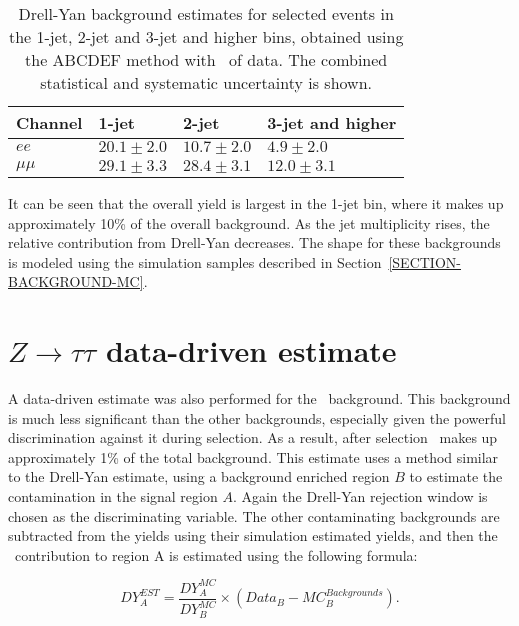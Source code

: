 \begin{table}[!h]
\begin{center}
   \begin{tabular}{l | lll}
    \hline
    Channel    & 1-jet       & 2-jet & 3-jet and higher \\
    \hline
    $ee$       & $20.1\pm 2.0$ & $10.7\pm 2.0$ & $4.9\pm 2.0$\\
    $\mu\mu $  & $29.1\pm 3.3$ & $28.4\pm 3.1$ & $12.0\pm 3.1$\\
    \hline
   \end{tabular}
 \caption{Drell-Yan background estimates for selected events in the 1-jet, 2-jet and 3-jet and higher bins, obtained using the ABCDEF method with \LUMI\ of data. The combined statistical and systematic uncertainty is shown.}
\label{TABLE-ABCD-RESULTS}
\end{center}
\end{table}

It can be seen that the overall yield is largest in the 1-jet bin, where it makes up approximately 10\% of the overall background. As the jet multiplicity rises, the relative contribution from Drell-Yan decreases. The shape for these backgrounds is modeled using the simulation samples described in Section~\ref{SECTION-BACKGROUND-MC}.

\section{$Z\to\tau\tau$ data-driven estimate}
\label{SECTION-ZTAUTAU-ESTIMATE}

A data-driven estimate was also performed for the \Ztt\ background. This background is much less significant than the other backgrounds, especially given the powerful discrimination against it during selection. As a result, after selection \Ztt\ makes up approximately 1\% of the total background. This estimate uses a method similar to the Drell-Yan estimate, using a background enriched region $B$ to estimate the contamination in the signal region $A$. Again the Drell-Yan rejection window is chosen as the discriminating variable. The other contaminating backgrounds are subtracted from the yields using their simulation estimated yields, and then the \Ztt\ contribution to region A is estimated using the following formula:

\begin{equation}
DY_{A}^{EST} = \frac{DY_{A}^{MC}}{DY_{B}^{MC}} \times (Data_{B} - MC_{B}^{Backgrounds}).
\end{equation}

